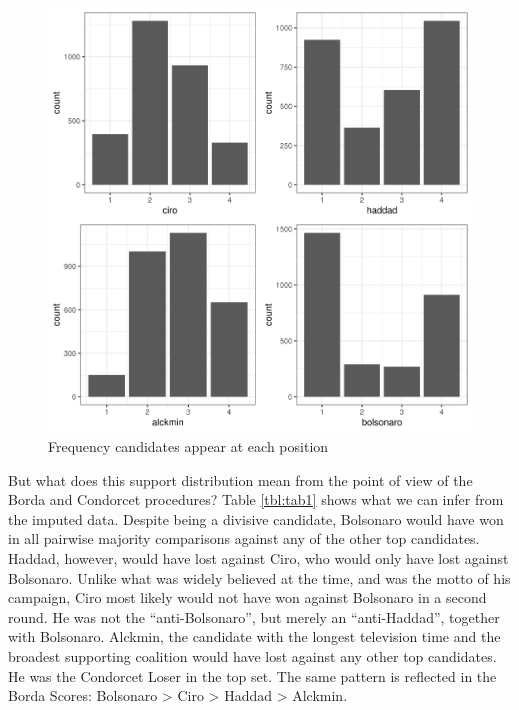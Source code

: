 \documentclass[hidelinks,11pt]{article}
\begin{document}
\begin{figure}[H]
 \centering
 \includegraphics[width=0.8\columnwidth,
 height=0.5\textheight]{./images/corrected1_indexes_plot.png}
 \caption{Frequency candidates appear at each position}
 \label{fig:counts}
\end{figure}

But what does this support distribution mean from the point of view of the Borda and Condorcet procedures? Table \ref{tbl:tab1} shows what we can infer from the imputed data. Despite being a divisive candidate, Bolsonaro would have won in all pairwise majority comparisons against any of the other top candidates. Haddad, however, would have lost against Ciro, who would only have lost against Bolsonaro. Unlike what was widely believed at the time, and was the motto of  his campaign, Ciro most likely would not have won against Bolsonaro in a second round. He was not the ``anti-Bolsonaro'', but merely an ``anti-Haddad'', together with Bolsonaro. Alckmin, the candidate with the longest television time and the broadest supporting coalition would have lost against any other top candidates. He was the Condorcet Loser in the top set. The same pattern is reflected in the Borda Scores: Bolsonaro > Ciro > Haddad > Alckmin.
\end{document}
